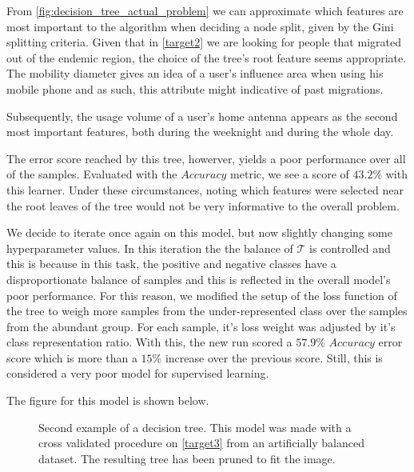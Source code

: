 \smallskip


From \cref{fig:decision_tree_actual_problem} we can approximate which features are most important to the algorithm when deciding a node split, given by the Gini splitting criteria.
Given that in \cref{target2} we are looking for people that migrated out of the endemic region, the choice of the tree's root feature seems appropriate.
The mobility diameter gives an idea of a user's influence area when using his mobile phone and as such, this attribute might indicative of past migrations.

Subsequently, the usage volume of a user's home antenna appears as the second most important features, both during the weeknight and during the whole day.

The error score reached by this tree, howerver, yields a poor performance over all of the samples.
Evaluated with the $Accuracy$ metric, we see a score of $43.2\%$ with this learner.
Under these circumstances, noting which features were selected near the root leaves of the tree would not be very informative to the overall problem.

We decide to iterate once again on this model, but now slightly changing some hyperparameter values.
In this iteration the the balance of $\mathcal{T}$ is controlled and this is because in this task, the positive and negative classes have a disproportionate balance of samples and this is reflected in the overall model's poor performance.
For this reason, we modified the setup of the loss function of the tree to weigh more samples from the under-represented class over the samples from the abundant group.
For each sample, it's loss weight was adjusted by it's class representation ratio.
With this, the new run scored a $57.9\%$ $Accuracy$ error score which is more than a $15\%$ increase over the previous score.
Still, this is considered a very poor model for supervised learning.

The figure for this model is shown below.

\bigskip

\begin{figure}
	\centering
	\caption{ Second example of a decision tree.
		This model was made with a cross validated procedure on \cref{target3} from an artificially balanced dataset.
		The resulting tree has been pruned to fit the image.}
	\label{fig:decision_tree_actual_problem2}
\end{figure}


